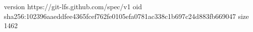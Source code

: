 version https://git-lfs.github.com/spec/v1
oid sha256:102396aaeddfee4365fcef762fe0105efa0781ac338c1b697c24d883fb669047
size 1462

